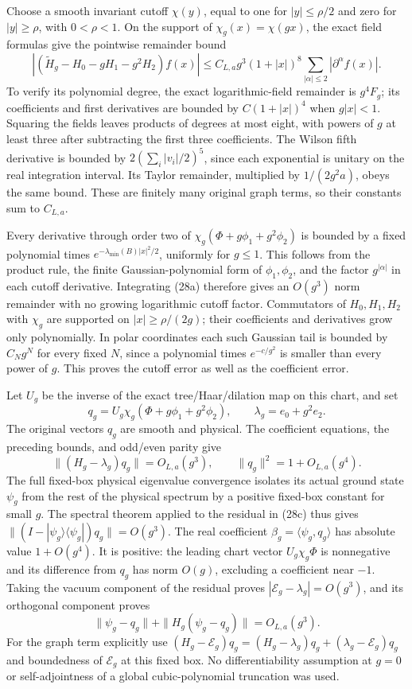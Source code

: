 \documentclass[
  11pt,
]{article}
\begin{document}
Choose a smooth invariant cutoff \(\chi(y)\), equal to one for
\(|y|\le\rho/2\) and zero for \(|y|\ge\rho\), with \(0<\rho<1\). On the
support of \(\chi_g(x)=\chi(gx)\), the exact field formulas give the
pointwise remainder bound \[
 |(\widetilde H_g-H_0-gH_1-g^2H_2)f(x)|
 \le C_{L,a}g^3(1+|x|)^8
                    \sum_{|\alpha|\le2}|\partial^\alpha f(x)|.
 \tag{28a}
\] To verify its polynomial degree, the exact logarithmic-field
remainder is \(g^4F_g\); its coefficients and first derivatives are
bounded by \(C(1+|x|)^4\) when \(g|x|<1\). Squaring the fields leaves
products of degrees at most eight, with powers of \(g\) at least three
after subtracting the first three coefficients. The Wilson fifth
derivative is bounded by \(2(\sum_i|v_i|/2)^5\), since each exponential
is unitary on the real integration interval. Its Taylor remainder,
multiplied by \(1/(2g^2a)\), obeys the same bound. These are finitely
many original graph terms, so their constants sum to \(C_{L,a}\).

Every derivative through order two of \(\chi_g(\Phi+g\phi_1+g^2\phi_2)\)
is bounded by a fixed polynomial times
\(e^{-\lambda_{\min}(B)|x|^2/2}\), uniformly for \(g\le1\). This follows
from the product rule, the finite Gaussian-polynomial form of
\(\phi_1,\phi_2\), and the factor \(g^{|\alpha|}\) in each cutoff
derivative. Integrating (28a) therefore gives an \(O(g^3)\) norm
remainder with no growing logarithmic cutoff factor. Commutators of
\(H_0,H_1,H_2\) with \(\chi_g\) are supported on \(|x|\ge\rho/(2g)\);
their coefficients and derivatives grow only polynomially. In polar
coordinates each such Gaussian tail is bounded by \(C_Ng^N\) for every
fixed \(N\), since a polynomial times \(e^{-c/g^2}\) is smaller than
every power of \(g\). This proves the cutoff error as well as the
coefficient error.

Let \(U_g\) be the inverse of the exact tree/Haar/dilation map on this
chart, and set \[
 q_g=U_g\chi_g(\Phi+g\phi_1+g^2\phi_2),\qquad
 \lambda_g=e_0+g^2e_2.
 \tag{28b}
\] The original vectors \(q_g\) are smooth and physical. The coefficient
equations, the preceding bounds, and odd/even parity give \[
 \|(H_g-\lambda_g)q_g\|=O_{L,a}(g^3),\qquad
                     \|q_g\|^2=1+O_{L,a}(g^4).
 \tag{28c}
\] The full fixed-box physical eigenvalue convergence isolates its
actual ground state \(\psi_g\) from the rest of the physical spectrum by
a positive fixed-box constant for small \(g\). The spectral theorem
applied to the residual in (28c) thus gives
\(\|(I-|\psi_g\rangle\langle\psi_g|)q_g\|=O(g^3)\). The real coefficient
\(\beta_g=\langle\psi_g,q_g\rangle\) has absolute value \(1+O(g^4)\). It
is positive: the leading chart vector \(U_g\chi_g\Phi\) is nonnegative
and its difference from \(q_g\) has norm \(O(g)\), excluding a
coefficient near \(-1\). Taking the vacuum component of the residual
proves \(|\mathcal E_g-\lambda_g|=O(g^3)\), and its orthogonal component
proves \[
 \|\psi_g-q_g\|+\|H_g(\psi_g-q_g)\|=O_{L,a}(g^3).
 \tag{28d}
\] For the graph term explicitly use
\((H_g-\mathcal E_g)q_g=(H_g-\lambda_g)q_g+
(\lambda_g-\mathcal E_g)q_g\) and boundedness of \(\mathcal E_g\) at
this fixed box. No differentiability assumption at \(g=0\) or
self-adjointness of a global cubic-polynomial truncation was used.
\end{document}
